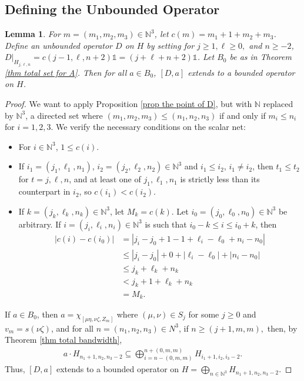 \documentclass[12pt]{amsart}
\newcommand{\sse}{\subseteq}
\newcommand{\N}{\mathbb{N}}
\newcommand{\ze}{\zeta}
\theoremstyle{plain} %
\newtheorem{Lemma}[Theorem]{Lemma}
\theoremstyle{definition} %
\begin{document}
\subsection{Defining the Unbounded Operator}


\begin{Lemma}\label{lem defining D}
    For $m = (m_1, m_2, m_3) \in \N^3$, let $c(m) = m_1 + 1 + m_2+ m_3$. Define an unbounded operator $D$ on $H$ by setting for $j \ge 1, \ell \ge 0,$ and $n \ge -2$, $D|_{H_{j,\ell,n}} = c(j-1, \ell, n+2) \mathds{1} = (j + \ell + n + 2)\mathds{1}$.
    Let $B_0$ be as in Theorem \ref{thm total set for A}. Then for all $a \in B_0$, $[D, a]$ extends to a bounded operator on $H$.
\end{Lemma}

\begin{proof}
We want to apply Proposition \ref{prop the point of D}, but with $\N$ replaced by $\N^3$, a directed set where $(m_1, m_2, m_3) \le (n_1, n_2, n_3)$ if and only if $m_i \le n_i$ for $i=1,2,3.$ We verify the necessary conditions on the scalar net:
\begin{itemize}
    \item For $i \in \N^3$, $1 \le c(i)$.
    \item If $i_1 =(j_1, \ell_1, n_1)$, $i_2 = (j_2, \ell_2, n_2) \in \N^3$ and $i_1 \le i_2$, $i_1 \neq i_2$, then $t_1 \le t_2$ for $t=j,\ell,n$, and at least one of $j_1, \ell_1, n_1$ is strictly less than its counterpart in $i_2$, so $c(i_1) <  c(i_2)$.
    \item If $k = (j_k, \ell_k, n_k) \in \N^3$, let $M_k = c(k)$. Let $i_0 = (j_0, \ell_0, n_0) \in \N^3$ be arbitrary. If $i = (j_i, \ell_i, n_i) \in \N^3$ is such that $i_0 - k \le i \le i_0 + k$, then 
    \begin{align*}
        |c(i) - c(i_0)| &= |j_i - j_0 +1 - 1 + \ell_i - \ell_0 + n_i - n_0|\\
        &\le |j_i - j_0| + 0 + |\ell_i - \ell_0| + |n_i - n_0|\\
        &\le j_k + \ell_k + n_k\\
        &< j_k + 1 + \ell_k + n_k\\
        &= M_k.
    \end{align*}
\end{itemize}
    If $a \in B_0$, then $a = \chi_{[\mu\eta, \nu\ze, Z_m]}$ where $(\mu,\nu) \in S_j$ for some $j \ge 0$ and $v_m = s(\nu\ze)$, and for all $n = (n_1, n_2, n_3) \in N^3$, if $n \ge (j+1, m, m),$ then, by Theorem \ref{thm total bandwidth},
    \begin{align*}
        a \cdot H_{n_1 + 1, n_2, n_3-2} \sse \bigoplus_{i = n-(0,m,m)}^{n+(0,m,m)} H_{i_1 + 1, i_2, i_3 - 2}.
    \end{align*}
    Thus, $[D,a]$ extends to a bounded operator on $H = \bigoplus_{n\in \N^3} H_{n_1+1, n_2, n_3-2}$.
\end{proof}
\end{document}

